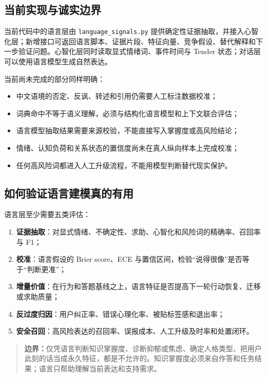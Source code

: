 \documentclass[UTF8,a4paper,11pt]{ctexart}
\newcommand{\boundary}[1]{\begin{quote}\noindent\textbf{\color{TenderPink}边界：}#1\end{quote}}
\begin{document}
\subsection{当前实现与诚实边界}

当前代码中的语言层由 \texttt{language\_signals.py} 提供确定性证据抽取，并接入心智化层；新增接口可返回语言脚本、证据片段、特征向量、竞争假设、替代解释和下一步验证问题。心智化层同时读取显式情绪词、事件时间与 Tender 状态；对话层可以使用语言模型生成自然表达。

当前尚未完成的部分同样明确：

\begin{itemize}
\item 中文语境的否定、反讽、转述和引用仍需要人工标注数据校准；
\item 词典命中不等于语义理解，必须与结构化语言模型和上下文联合评估；
\item 语言模型抽取结果需要来源校验，不能直接写入掌握度或高风险结论；
\item 情绪、认知负荷和关系状态的置信度尚未在真人纵向样本上完成校准；
\item 任何高风险词都进入人工升级流程，不能用模型判断替代现实保护。
\end{itemize}

\subsection{如何验证语言建模真的有用}

语言层至少需要五类评估：

\begin{enumerate}
\item \textbf{证据抽取}：对显式情绪、不确定性、求助、心智化和风险词的精确率、召回率与 F1；
\item \textbf{校准}：语言假设的 Brier score、ECE 与置信区间，检验“说得很像”是否等于“判断更准”；
\item \textbf{增量价值}：在行为和答题基线之上，语言特征是否提高下一轮行动恢复、迁移或求助质量；
\item \textbf{反过度归因}：用户纠正率、错误心理化率、被贴标签感和退出率；
\item \textbf{安全召回}：高风险表达的召回率、误报成本、人工升级及时率和处置闭环。
\end{enumerate}

\boundary{仅凭语言判断知识掌握度、诊断抑郁或焦虑、确定人格类型、把用户此刻的话当成永久特征，都是不允许的。知识掌握度必须来自作答和任务结果；语言只帮助理解当前表达和支持需求。}
\end{document}
